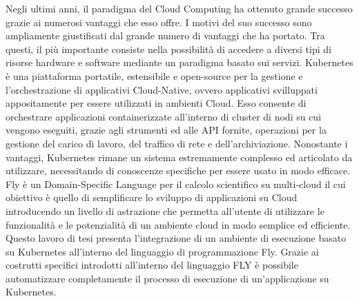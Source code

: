 Negli ultimi anni, il paradigma del Cloud Computing ha ottenuto grande successo grazie ai numerosi vantaggi che esso offre.
I motivi del suo successo sono ampliamente giustificati dal grande numero di vantaggi che ha portato. 
Tra questi, il più importante consiste nella possibilità di accedere a diversi tipi di risorse hardware e software mediante un paradigma
basato sui servizi. 
Kubernetes è una piattaforma portatile, estensibile e open-source per la gestione e l'orchestrazione di applicativi Cloud-Native,
ovvero applicativi svilluppati appositamente per essere utilizzati in ambienti Cloud. 
Esso consente di orchestrare applicazioni containerizzate all'interno di cluster di nodi su cui vengono eseguiti, grazie agli strumenti ed alle API fornite, operazioni per la gestione del carico di lavoro, 
del traffico di rete e dell'archiviazione. 
Nonostante i vantaggi, Kubernetes rimane un sistema estremamente complesso ed articolato da utilizzare, necessitando di conoscenze specifiche per essere usato in modo efficace.
Fly è un Domain-Specific Language per il calcolo scientifico su multi-cloud il cui obiettivo è quello di semplificare lo sviluppo di applicazioni su Cloud introducendo un livello di astrazione
che permetta all'utente di utilizzare le funzionalità e le potenzialità di un ambiente cloud in modo semplice ed efficiente. 
Questo lavoro di tesi presenta l'integrazione di un ambiente di esecuzione basato su Kubernetes all'interno del linguaggio di programmazione Fly. 
Grazie ai costrutti specifici introdotti all'interno del linguaggio FLY è possibile automatizzare completamente il processo di esecuzione di un'applicazione su Kubernetes.